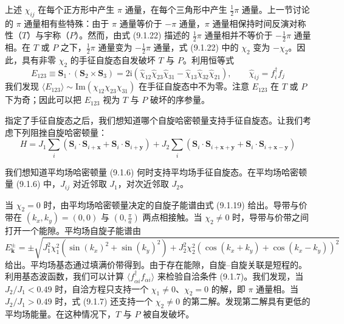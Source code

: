上述 $\chi_{ij}$ 在每个正方形中产生 $\pi$ 通量，在每个三角形中产生 $\frac{1}{2}\pi$ 通量。上一节讨论的 $\pi$ 通量相有些特殊：由于 $\pi$ 通量等价于 $-\pi$ 通量，$\pi$ 通量相保持时间反演对称性（$T$）与宇称（$P$）。然而，由式 (9.1.22) 描述的 $\frac{1}{2}\pi$ 通量相并不等价于 $-\frac{1}{2}\pi$ 通量相。在 $T$ 或 $P$ 之下，$\frac{1}{2}\pi$ 通量变为 $-\frac{1}{2}\pi$ 通量，式 (9.1.22) 中的 $\chi_2$ 变为 $-\chi_2$。因此，具有非零 $\chi_2$ 的手征自旋态自发破坏 $T$ 与 $P$。利用恒等式
\begin{equation*}
E_{123}\equiv\pmb{S}_1\cdot(\pmb{S}_2\times\pmb{S}_3)=2\mathrm{i}(\hat{\chi}_{12}\hat{\chi}_{23}\hat{\chi}_{31}-\hat{\chi}_{13}\hat{\chi}_{32}\hat{\chi}_{21}),\qquad \hat{\chi}_{ij}=f^{\dagger}_if_j
\tag{9.1.23}
\end{equation*}
我们发现 $\langle E_{123}\rangle\sim\mathrm{Im}(\chi_{12}\chi_{23}\chi_{31})$ 在手征自旋态中不为零。注意 $E_{123}$ 在 $T$ 或 $P$ 下为奇；因此可以把 $E_{123}$ 视为 $T$ 与 $P$ 破坏的序参量。

指定了手征自旋态之后，我们想知道哪个自旋哈密顿量支持手征自旋态。让我们考虑下列阻挫自旋哈密顿量：
\begin{equation*}
H=J_1\sum_i(\pmb{S}_i\cdot\pmb{S}_{i+\pmb{x}}+\pmb{S}_i\cdot\pmb{S}_{i+\pmb{y}})+J_2\sum_i(\pmb{S}_i\cdot\pmb{S}_{i+\pmb{x}+\pmb{y}}+\pmb{S}_i\cdot\pmb{S}_{i+\pmb{x}-\pmb{y}})
\tag{9.1.24}
\end{equation*}

我们想知道平均场哈密顿量 (9.1.6) 何时支持平均场手征自旋态。在平均场哈密顿量 (9.1.6) 中，$J_{ij}$ 对近邻取 $J_1$，对次近邻取 $J_2$。

当 $\chi_2=0$ 时，由平均场哈密顿量决定的自旋子能谱由式 (9.1.19) 给出。导带与价带在 $(k_x,k_y)=(0,0)$ 与 $(0,\frac{\pi}{a})$ 两点相接触。当 $\chi_2\neq0$ 时，导带与价带之间打开一个能隙。平均场自旋子能谱由
\begin{equation*}
E^{\pm}_{\pmb{k}}=\pm\sqrt{J_1^2\chi_1^2(\sin(k_x)^2+\sin(k_y)^2)+J_2^2\chi_2^2(\cos(k_x+k_y)+\cos(k_x-k_y))^2}
\tag{9.1.25}
\end{equation*}
给出。平均场基态通过填满价带得到。由于存在能隙，自旋--自旋关联是短程的。利用基态波函数，我们可以计算 $\langle f^{\dagger}_{\alpha i}f_{\alpha i}\rangle$ 来检验自洽条件 (9.1.7)。我们发现，当 $J_2/J_1<0.49$ 时，自洽方程只支持一个 $\chi_1\neq0$、$\chi_2=0$ 的解，即 $\pi$ 通量相。当 $J_2/J_1>0.49$ 时，式 (9.1.7) 还支持一个 $\chi_2\neq0$ 的第二解。发现第二解具有更低的平均场能量。在这种情况下，$T$ 与 $P$ 被自发破坏。

